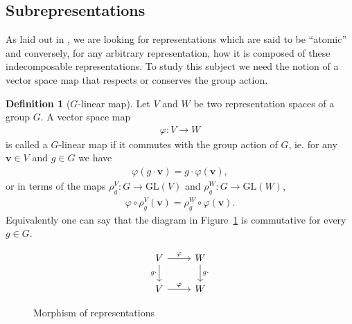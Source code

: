 \documentclass[12pt, a4paper, twoside]{article}
\theoremstyle{definition}
\newtheorem{definition}{Definition}[section]
\theoremstyle{remark}
\numberwithin{equation}{section}
\newcommand{\1}{\mathbf{1}}
\newcommand{\0}{\mathbf{0}}
\newcommand{\GL}{\text{GL}}
\newcommand{\vvec}{\mathbf{v}}
\begin{document}





\clearpage{\thispagestyle{empty}\cleardoublepage}
{\hypersetup{linkcolor=black}
\tableofcontents
}

%





\subsection{Subrepresentations}

	As laid out in \cite{FultonHarris}, we are looking for representations which are said to be ``atomic'' and conversely, for any arbitrary representation, how it is composed of these indecomposable representations. To study this subject we need the notion of a vector space map that respects or conserves the group action.
	
	
	

	\begin{definition}[$G$-linear map]\cite{FultonHarris}
		Let $V$ and $W$ be two representation spaces of a group $G$. A vector space map 
		\begin{align*}
			\varphi: V \rightarrow W
		\end{align*} 
		is called a $G$-linear map if it commutes with the group action of $G$, ie. for any $\vvec \in V$ and $g \in G$ we have
		\begin{align*}
			\varphi( g \cdot \vvec ) = g \cdot \varphi (\vvec),
		\end{align*}
		or in terms of the maps $\rho_g^V: G \rightarrow \GL(V)$ and $\rho_g^W: G \rightarrow \GL(W)$,
		\begin{align*}
			\varphi \circ \rho^V_g (\vvec) = \rho^W_g \circ \varphi (\vvec).
		\end{align*}
		Equivalently one can say that the diagram in Figure~\ref*{fig:commapmorp} is commutative for every $g \in G$.
		\begin{figure}%
			\centering
			\[\begin{tikzcd}
				V \arrow{r}{\varphi} \arrow[swap]{d}{g \cdot} & W \arrow{d}{g \cdot} \\
				V \arrow{r}{\varphi} & W
			\end{tikzcd}\]
			\caption{Morphism of representations}
			\label{fig:commapmorp}
		\end{figure}
	\end{definition}
	
\end{document}
